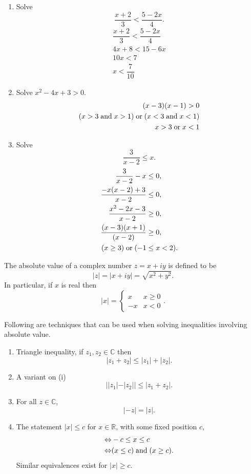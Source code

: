 \begin{example}
\begin{enumerate}
        \item Solve \[\dfrac{x+2}{3}<\dfrac{5-2x}{4}.\]
        \begin{align*}
            \dfrac{x+2}{3}<\dfrac{5-2x}{4}\\
            4x+8<15-6x\\
            10x<7\\
            x<\dfrac7{10}
        \end{align*}
        
        \item Solve $x^2-4x+3>0$.
        \begin{align*}
            (x-3)(x-1)>0\\
            (x>3\;\text{and}\; x>1)\;\text{or}\;(x<3\;\text{and}\; x<1)\\
            x>3\;\text{or}\; x<1
        \end{align*}
        
        \item Solve\[\dfrac{3}{x-2}\leq x.\]
        \begin{align*}
            \dfrac{3}{x-2}-x&\leq0,\\
            \dfrac{-x(x-2)+3}{x-2}&\leq0,\\
            \dfrac{x^2-2x-3}{x-2}&\geq0,\\
            \dfrac{(x-3)(x+1)}{(x-2)}&\geq0,\\
            (x\geq3)\;\text{or}\;(-1&\leq x<2).
        \end{align*}
    \end{enumerate}
\end{example}

\begin{definition}
    The absolute value of a complex number $z=x+iy$ is defined to be \[|z|=|x+iy|=\sqrt{x^2+y^2}.\] In particular, if $x$ is real then
    \[
        |x|=
        \begin{cases}
            x & x\geq0\\
            -x & x<0
        \end{cases}
        .
    \]
\end{definition}

Following are techniques that can be used when solving inequalities involving absolute value.

\begin{enumerate}
    \item Triangle inequality, if $z_1,z_2\in\mathbb C$ then \[|z_1+z_2|\leq|z_1|+|z_2|.\]
    \item A variant on (i) \[||z_1|-|z_2||\leq|z_1+z_2|.\]
    \item For all $z\in\mathbb C$, \[|-z|=|z|.\]
    \item The statement $|x|\leq c$ for $x\in\mathbb R$, with some fixed position $c$,
    \begin{align*}
        \Leftrightarrow&-c\leq x\leq c\\
        \Leftrightarrow&(x\leq c)\;\text{and}\;(x\geq c).
    \end{align*}
    Similar equivalences exist for $|x|\geq c$.
\end{enumerate}

